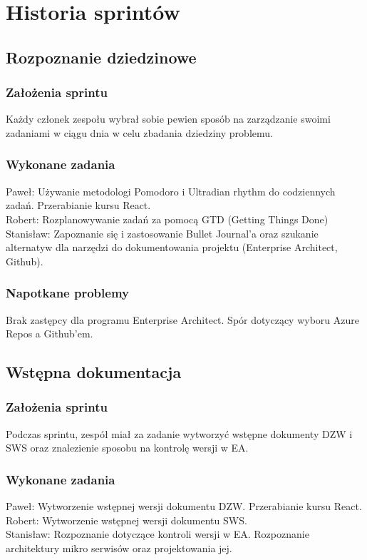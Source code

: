 \documentclass[a4paper,11pt]{report}
\begin{document}
\chapter {Historia sprintów}
\section {Rozpoznanie dziedzinowe}
\subsection {Założenia sprintu}
Każdy członek zespołu wybrał sobie pewien sposób na zarządzanie swoimi zadaniami w ciągu dnia w celu zbadania dziedziny problemu.
\subsection {Wykonane zadania}
Paweł: Używanie metodologi Pomodoro i Ultradian rhythm do codziennych zadań. Przerabianie kursu React.\\
Robert: Rozplanowywanie zadań za pomocą GTD (Getting Things Done)\\
Stanisław: Zapoznanie się i zastosowanie Bullet Journal'a oraz szukanie alternatyw dla narzędzi do dokumentowania projektu (Enterprise Architect, Github).\\
\subsection {Napotkane problemy}
Brak zastępcy dla programu Enterprise Architect. Spór dotyczący wyboru Azure Repos a Github'em.

\section {Wstępna dokumentacja}
\subsection {Założenia sprintu}
Podczas sprintu, zespół miał za zadanie wytworzyć wstępne dokumenty DZW i SWS oraz znalezienie sposobu na kontrolę wersji w EA.
\subsection {Wykonane zadania}
Paweł: Wytworzenie wstępnej wersji dokumentu DZW. Przerabianie kursu React.\\
Robert: Wytworzenie wstępnej wersji dokumentu SWS.\\
Stanisław: Rozpoznanie dotyczące kontroli wersji w EA. Rozpoznanie architektury mikro serwisów oraz projektowania jej.\\
\end{document}
